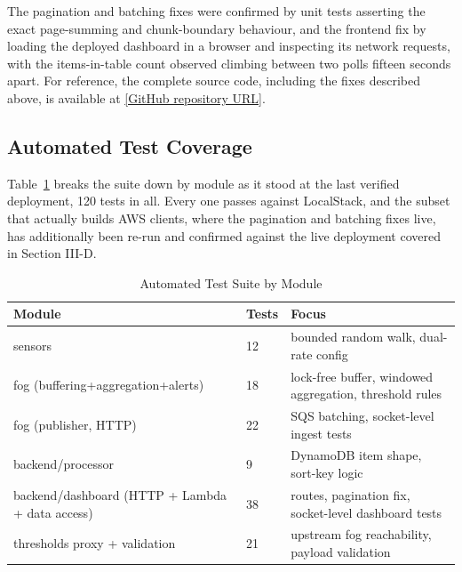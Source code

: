 \documentclass[conference]{IEEEtran}
\begin{document}
The pagination and batching fixes were confirmed by unit tests asserting the exact page-summing and chunk-boundary behaviour, and the frontend fix by loading the deployed dashboard in a browser and inspecting its network requests, with the items-in-table count observed climbing between two polls fifteen seconds apart. For reference, the complete source code, including the fixes described above, is available at \href{[GitHub repository URL]}{[GitHub repository URL]}.

\subsection{Automated Test Coverage}
Table~\ref{tab:tests} breaks the suite down by module as it stood at the last verified deployment, 120 tests in all. Every one passes against LocalStack, and the subset that actually builds AWS clients, where the pagination and batching fixes live, has additionally been re-run and confirmed against the live deployment covered in Section III-D.

\begin{table}[!t]
\caption{Automated Test Suite by Module}
\label{tab:tests}
\centering
\footnotesize
\begin{tabular}{|p{3.3cm}|p{0.6cm}|p{3.3cm}|}
\hline
\textbf{Module} & \textbf{Tests} & \textbf{Focus} \\
\hline
sensors & 12 & bounded random walk, dual-rate config \\
\hline
fog (buffering+aggregation+alerts) & 18 & lock-free buffer, windowed aggregation, threshold rules \\
\hline
fog (publisher, HTTP) & 22 & SQS batching, socket-level ingest tests \\
\hline
backend/processor & 9 & DynamoDB item shape, sort-key logic \\
\hline
backend/dashboard (HTTP + Lambda + data access) & 38 & routes, pagination fix, socket-level dashboard tests \\
\hline
thresholds proxy + validation & 21 & upstream fog reachability, payload validation \\
\hline
\end{tabular}
\end{table}
\end{document}
